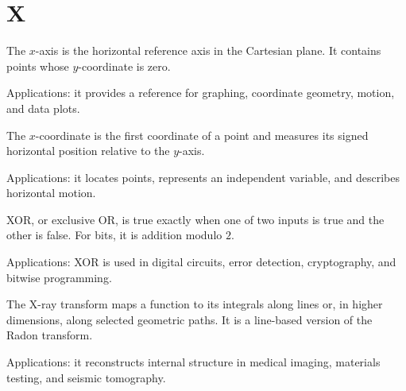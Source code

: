 \chapter*{X}
\label{chap:x}

The $x$-axis is the horizontal reference axis in the Cartesian plane. It contains points whose $y$-coordinate is zero. \par\noindent Applications: it provides a reference for graphing, coordinate geometry, motion, and data plots.

The $x$-coordinate is the first coordinate of a point and measures its signed horizontal position relative to the $y$-axis. \par\noindent Applications: it locates points, represents an independent variable, and describes horizontal motion.

XOR, or exclusive OR, is true exactly when one of two inputs is true and the other is false. For bits, it is addition modulo $2$. \par\noindent Applications: XOR is used in digital circuits, error detection, cryptography, and bitwise programming.

The X-ray transform maps a function to its integrals along lines or, in higher dimensions, along selected geometric paths. It is a line-based version of the Radon transform. \par\noindent Applications: it reconstructs internal structure in medical imaging, materials testing, and seismic tomography.
